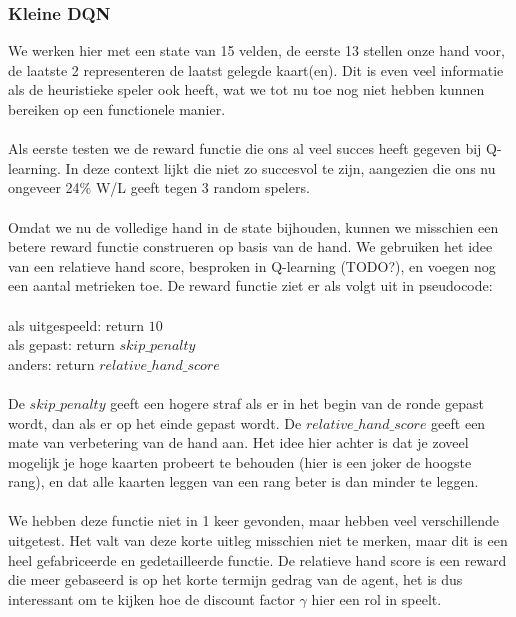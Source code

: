 \documentclass[11pt]{article}
\begin{document}
\subsubsection{Kleine DQN}
We werken hier met een state van 15 velden, de eerste 13 stellen onze hand voor, de laatste 2 representeren de laatst gelegde kaart(en). Dit is even veel informatie als de heuristieke speler ook heeft, wat we tot nu toe nog niet hebben kunnen bereiken op een functionele manier.\\\\
Als eerste testen we de reward functie die ons al veel succes heeft gegeven bij Q-learning. In deze context lijkt die niet zo succesvol te zijn, aangezien die ons nu ongeveer 24\% W/L geeft tegen 3 random spelers. \\\\
Omdat we nu de volledige hand in de state bijhouden, kunnen we misschien een betere reward functie construeren op basis van de hand. We gebruiken het idee van een relatieve hand score, besproken in Q-learning (TODO?), en voegen nog een aantal metrieken toe. De reward functie ziet er als volgt uit in pseudocode:\\\\
\indent als uitgespeeld: return $10$\\
\indent als gepast: return $skip\_penalty$\\
\indent anders: return $relative\_hand\_score$\\\\
De $skip\_penalty$ geeft een hogere straf als er in het begin van de ronde gepast wordt, dan als er op het einde gepast wordt. De $relative\_hand\_score$ geeft een mate van verbetering van de hand aan. Het idee hier achter is dat je zoveel mogelijk je hoge kaarten probeert te behouden (hier is een joker de hoogste rang), en dat alle kaarten leggen van een rang beter is dan minder te leggen. \\\\
We hebben deze functie niet in 1 keer gevonden, maar hebben veel verschillende uitgetest. Het valt van deze korte uitleg misschien niet te merken, maar dit is een heel gefabriceerde en gedetailleerde functie. De relatieve hand score is een reward die meer gebaseerd is op het korte termijn gedrag van de agent, het is dus interessant om te kijken hoe de discount factor $\gamma$ hier een rol in speelt.\\
\end{document}
